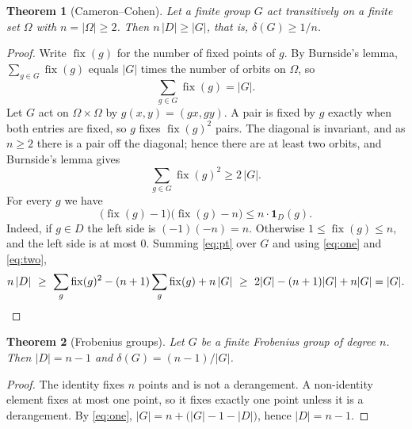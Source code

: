 \documentclass[11pt]{article}
\newtheorem{theorem}{Theorem}
\theoremstyle{remark}
\newcommand{\fix}{\operatorname{fix}}
\begin{document}
\begin{theorem}[Cameron--Cohen]\label{thm:cc}
Let a finite group $G$ act transitively on a finite set $\Omega$ with
$n=|\Omega|\ge2$. Then $n\,|D|\ge|G|$, that is, $\delta(G)\ge1/n$.
\end{theorem}
\begin{proof}
Write $\fix(g)$ for the number of fixed points of $g$. By Burnside's
lemma, $\sum_{g\in G}\fix(g)$ equals $|G|$ times the number of orbits
on $\Omega$, so
\begin{equation}\label{eq:one}
 \sum_{g\in G}\fix(g)=|G| .
\end{equation}
Let $G$ act on $\Omega\times\Omega$ by $g(x,y)=(gx,gy)$. A pair is fixed
by $g$ exactly when both entries are fixed, so $g$ fixes $\fix(g)^2$
pairs. The diagonal is invariant, and as $n\ge2$ there is a pair off the
diagonal; hence there are at least two orbits, and Burnside's lemma
gives
\begin{equation}\label{eq:two}
 \sum_{g\in G}\fix(g)^2\ge2\,|G| .
\end{equation}
For every $g$ we have
\begin{equation}\label{eq:pt}
 \bigl(\fix(g)-1\bigr)\bigl(\fix(g)-n\bigr)\le n\cdot\mathbf 1_D(g).
\end{equation}
Indeed, if $g\in D$ the left side is $(-1)(-n)=n$. Otherwise
$1\le\fix(g)\le n$, and the left side is at most $0$. Summing
\eqref{eq:pt} over $G$ and using \eqref{eq:one} and \eqref{eq:two},
\[
 n\,|D|\ \ge\ \sum_{g}\fix(g)^2-(n+1)\sum_{g}\fix(g)+n\,|G|
 \ \ge\ 2|G|-(n+1)|G|+n|G|=|G| .\qedhere
\]
\end{proof}

\begin{theorem}[Frobenius groups]\label{thm:frob}
Let $G$ be a finite Frobenius group of degree $n$. Then $|D|=n-1$ and
$\delta(G)=(n-1)/|G|$.
\end{theorem}
\begin{proof}
The identity fixes $n$ points and is not a derangement. A non-identity
element fixes at most one point, so it fixes exactly one point unless it
is a derangement. By \eqref{eq:one},
$|G|=n+\bigl(|G|-1-|D|\bigr)$, hence $|D|=n-1$.
\end{proof}
\end{document}
